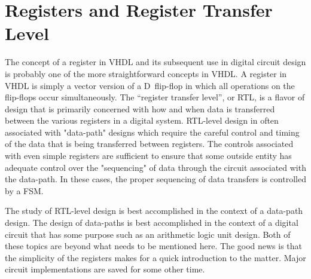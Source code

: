 %
%
\chapter{Registers and Register Transfer Level}
The concept of a register in VHDL and its subsequent use in digital circuit design is probably one of the more straightforward concepts in VHDL. A register in VHDL is simply a vector version of a D~flip-flop in which all operations on the flip-flops occur simultaneously. The ``register transfer level'', or RTL, is a flavor of design that is primarily concerned with how and when data is transferred between the various registers in a digital system. RTL-level design in often associated with "data-path" designs which require the careful control and timing of the data that is being transferred between registers. The controls associated with even simple registers are sufficient to ensure that some outside entity has adequate control over the "sequencing" of data through the circuit associated with the data-path. In these cases, the proper sequencing of data transfers is controlled by a FSM.

The study of RTL-level design is best accomplished in the context of a data-path design. The design of data-paths is best accomplished in the context of a digital circuit that has some purpose such as an arithmetic logic unit design. Both of these topics are beyond what needs to be mentioned here. The good news is that the simplicity of the registers makes for a quick introduction to the matter. Major circuit implementations are saved for some other time.

